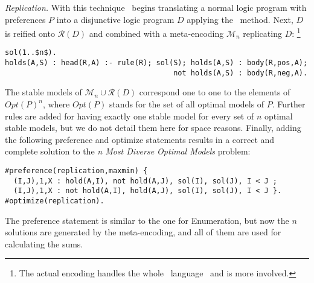 \emph{Replication.}
%
With this technique  \asprin\ begins translating a normal logic program with preferences $P$ 
into a disjunctive logic program $D$ applying the \gc\ method.
%
Next, $D$ is reified onto $\mathcal{R}(D)$ and combined with a meta-encoding $\mathcal{M}_n$ 
replicating $D$:%
\footnote{The actual encoding handles the whole \clingo\ language~\cite{gekakasc14b} and is more involved.}
\begin{lstlisting}[mathescape=true]
sol(1..$n$).
holds(A,S) : head(R,A) :- rule(R); sol(S); holds(A,S) : body(R,pos,A);
                                       not holds(A,S) : body(R,neg,A).
\end{lstlisting}
%
The stable models of $\mathcal{M}_n \cup \mathcal{R}(D)$ correspond one to one 
to the elements of $\mathit{Opt}(P)^n$, 
where $\mathit{Opt}(P)$ stands for the set of all optimal models of $P$.
%
Further rules are added for having exactly one stable model for every set of $n$ optimal stable models, 
but we do not detail them here for space reasons.
%
Finally, adding the following preference and optimize statements results  
in a correct and complete solution to the \emph{n Most Diverse Optimal Models} problem:
\begin{lstlisting}
#preference(replication,maxmin) { 
  (I,J),1,X : hold(A,I), not hold(A,J), sol(I), sol(J), I < J ; 
  (I,J),1,X : not hold(A,I), hold(A,J), sol(I), sol(J), I < J }.
#optimize(replication).
\end{lstlisting}
The preference statement is similar to the one for Enumeration, 
but now the $n$ solutions are generated by the meta-encoding, 
and all of them are used for calculating the sums.

